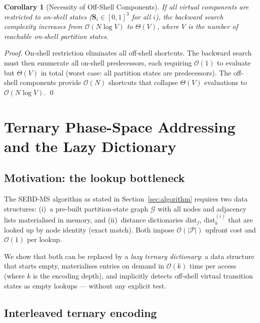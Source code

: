 \documentclass[twocolumn,10pt,a4paper]{article}
\theoremstyle{thmstyle}
\newtheorem{corollary}[theorem]{Corollary}
\theoremstyle{definition}
\theoremstyle{remark}
\newcommand{\Parts}{\mathcal{P}}
\newcommand{\Sv}{\mathbf{S}}
\newcommand{\calG}{\mathcal{G}}
\begin{document}
\begin{corollary}[Necessity of Off-Shell Components]
\label{cor:necessity}
If all virtual components are restricted to on-shell states
($\Sv_i \in [0,1]^3$ for all $i$), the backward search complexity
increases from $\mathcal{O}(N \log V)$ to $\Theta(V)$, where $V$ is
the number of reachable on-shell partition states.
\end{corollary}

\begin{proof}
On-shell restriction eliminates all off-shell shortcuts. The backward
search must then enumerate all on-shell predecessors, each requiring
$\mathcal{O}(1)$ to evaluate but $\Theta(V)$ in total (worst case: all
partition states are predecessors). The off-shell components provide
$\mathcal{O}(N)$ shortcuts that collapse $\Theta(V)$ evaluations to
$\mathcal{O}(N \log V)$. \qed
\end{proof}

\section{Ternary Phase-Space Addressing and the Lazy Dictionary}
\label{sec:ternary}

\subsection{Motivation: the lookup bottleneck}

The SEBD-MS algorithm as stated in Section~\ref{sec:algorithm} requires
two data structures: (i)~a pre-built partition-state graph $\calG$ with
all nodes and adjacency lists materialised in memory, and (ii)~distance
dictionaries $\text{dist}_f$, $\text{dist}_b^{(i)}$ that are looked up
by node identity (exact match). Both impose $\mathcal{O}(|\Parts|)$
upfront cost and $\mathcal{O}(1)$ per lookup.

We show that both can be replaced by a \emph{lazy ternary dictionary}:
a data structure that starts empty, materialises entries on demand in
$\mathcal{O}(k)$ time per access (where $k$ is the encoding depth), and
implicitly detects off-shell virtual transition states as empty lookups
--- without any explicit test.

\subsection{Interleaved ternary encoding}
\end{document}

